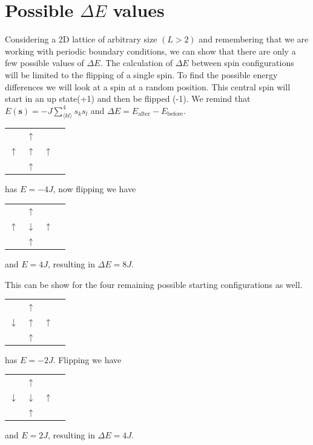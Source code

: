 \documentclass[english,notitlepage,reprint,nofootinbib]{revtex4-1}  %
\begin{document}
\section{Possible $\Delta E$ values}\label{appendix:delta_E}
Considering a 2D lattice of arbitrary size $(L>2)$ and remembering that we are working with periodic boundary conditions, we can show that there are only a few possible values of $\Delta E$. The calculation of $\Delta E$ between spin configurations will be limited to the flipping of a single spin. To find the possible energy differences we will look at a spin at a random position. This central spin will start in an up state(+1) and then be flipped (-1). We remind that $ E(\textbf{s}) = - J \sum^4_{\langle kl \rangle} s_k s_l$ and $ \Delta E = E_{\text{after}} - E_{\text{before}}$.
\begin{table}[H]
    \begin{tabular}{llll}
                   & $\uparrow$ &            \\
        $\uparrow$ & $\uparrow$ & $\uparrow$ \\
                   & $\uparrow$ &
    \end{tabular}
    has $E = -4J$, now flipping we have
    \begin{tabular}{llll}
                   & $\uparrow$   &            \\
        $\uparrow$ & $\downarrow$ & $\uparrow$ \\
                   & $\uparrow$   &
    \end{tabular}
    and $E = 4J$, resulting in $\Delta E = 8J$.
\end{table}
This can be show for the four remaining possible starting configurations as well.
\begin{table}[H]
    \begin{tabular}{llll}
                     & $\uparrow$ &            \\
        $\downarrow$ & $\uparrow$ & $\uparrow$ \\
                     & $\uparrow$ &
    \end{tabular}
    has $E = -2J$. Flipping we have
    \begin{tabular}{llll}
                     & $\uparrow$   &            \\
        $\downarrow$ & $\downarrow$ & $\uparrow$ \\
                     & $\uparrow$   &
    \end{tabular}
    and $E = 2J$, resulting in $\Delta E = 4J$.
\end{table}
\end{document}
